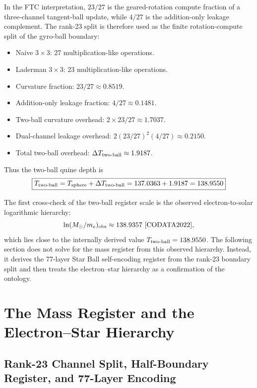 \documentclass[11pt,a4paper]{article}
\begin{document}
In the FTC interpretation, $23/27$ is the geared-rotation compute fraction of a three-channel tangent-ball update, while $4/27$ is the addition-only leakage complement. The rank-23 split is therefore used as the finite rotation-compute split of the gyro-ball boundary:

\begin{itemize}
  \item Naive $3\times3$: 27 multiplication-like operations.
  \item Laderman $3\times3$: 23 multiplication-like operations.
  \item Curvature fraction: $23/27 \approx 0.8519$.
  \item Addition-only leakage fraction: $4/27 \approx 0.1481$.
  \item Two-ball curvature overhead: $2 \times 23/27 \approx 1.7037$.
  \item Dual-channel leakage overhead: $2(23/27)^2(4/27) \approx 0.2150$.
  \item Total two-ball overhead: $\Delta T_{\rm two\text{-}ball} \approx 1.9187$.
\end{itemize}

Thus the two-ball quine depth is
\begin{equation}
\boxed{
T_{\rm two\text{-}ball}
=
T_{\rm sphere}+\Delta T_{\rm two\text{-}ball}
=
137.0363+1.9187
=
138.9550
}
\label{eq:138}
\end{equation}

The first cross-check of the two-ball register scale is the observed electron-to-solar logarithmic hierarchy:
\[
\ln(M_\odot/m_e)_{\rm obs} \approx 138.9357~\cite{CODATA2022},
\]
which lies close to the internally derived value \(T_{\rm two\text{-}ball}=138.9550\). The following section does not solve for the mass register from this observed hierarchy. Instead, it derives the 77-layer Star Ball self-encoding register from the rank-23 boundary split and then treats the electron--star hierarchy as a confirmation of the ontology.


\section{The Mass Register and the Electron--Star Hierarchy}


\subsection{Rank-23 Channel Split, Half-Boundary Register, and 77-Layer Encoding}
\label{sec:mass_channel}
\end{document}
